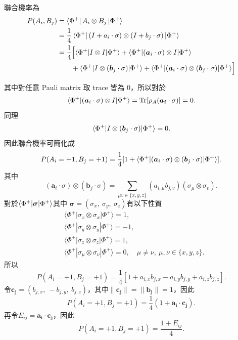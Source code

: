 \documentclass[12pt, a4paper, twoside, reqno]{article}
\begin{document}
\noindent 聯合機率為
\begin{equation}
    \begin{aligned}
        P(A_i,B_j)
        &=\bra{\Phi^+} A_i\otimes B_j\ket{\Phi^+}\\
        &=\frac{1}{4}\bra{\Phi^+} (I+a_i\cdot\sigma)\otimes(I+b_j\cdot\sigma)\ket{\Phi^+}\\
        &=\frac{1}{4}\Bigl[
        \braket{\Phi^+|I\otimes I|\Phi^+}
        +\braket{\Phi^+|(\bm{a}_i\cdot\sigma)\otimes I|\Phi^+}\\
    &\qquad
        +\braket{\Phi^+|I\otimes(\bm{b}_j\cdot\sigma)|\Phi^+}
        +\braket{\Phi^+|(\bm{a}_i\cdot\sigma)\otimes(\bm{b}_j\cdot\sigma)|\Phi^+}\Bigr]
    \end{aligned}
\end{equation}

\noindent 其中對任意 Pauli matrix 取 trace 皆為 $0$，所以對於
\[
    \braket{\Phi^+|(\bm{a}_i\cdot\sigma)\otimes I|\Phi^+}
    =\operatorname{Tr}[\rho_A(\bm{a_i}\cdot\sigma)]
    =0.
\]
\noindent 同理
\[
    \braket{\Phi^+|I\otimes(\bm{b}_j\cdot\sigma)|\Phi^+} = 0.
\]
\noindent 因此聯合機率可簡化成
\begin{equation}
    P(A_i=+1,B_j=+1) = \frac{1}{4}[1+\braket{\Phi^+|(\bm{a}_i\cdot\sigma)\otimes (\bm{b}_j\cdot\sigma)|\Phi^+}].
\end{equation}
\noindent 其中
\[
    (\bm{a}_i\cdot\sigma)\otimes (\bm{b}_j\cdot\sigma) = \sum_{\mu v \in\{x,y,z\}}(a_{i,\mu}b_{j,v})(\sigma_\mu\otimes\sigma_v).
\]
\noindent 對於$\braket{\Phi^+|\bm{\sigma}|\Phi^+}$其中 $\bm{\sigma}=(\sigma_x,~\sigma_y,~\sigma_z)$有以下性質
\[
\begin{aligned}
    &\langle\Phi^+|\sigma_x\otimes\sigma_x|\Phi^+\rangle = 1,\\
    &\langle\Phi^+|\sigma_y\otimes\sigma_y|\Phi^+\rangle = -1,\\
    &\langle\Phi^+|\sigma_z\otimes\sigma_z|\Phi^+\rangle = 1,\\
    &\langle\Phi^+|\sigma_\mu\otimes\sigma_\nu|\Phi^+\rangle = 0,
    \quad \mu\neq\nu,\ \mu,\nu\in\{x,y,z\}.
\end{aligned}
\]
\noindent 所以
\[
 P(A_i=+1,B_j=+1)=\frac{1}{4}[1+a_{i,x}b_{j,x}-a_{i,y}b_{j,y}+a_{i,z}b_{j,z}].
\]
令$\bm{c_j}=(b_{j,x},~-b_{j,y},~b_{j,z})$，其中$\|\bm{c_j}\|=\|\bm{b_j}\|=1$，因此
\[
    P(A_i=+1,B_j=+1)=\frac{1}{4}(1+\bm{a_i}\cdot\bm{c_j}).
\]
再令$E_{ij}=\bm{a_i}\cdot\bm{c_j}$，因此
\begin{equation}
    P(A_i=+1,B_j=+1)=\frac{1+E_{ij}}{4}.
\end{equation}
\end{document}

